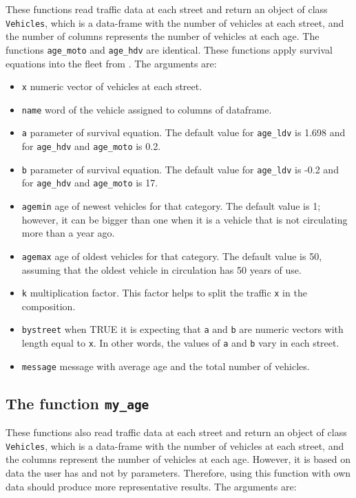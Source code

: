 \documentclass[12pt,graybox,envcountchap,sectrefs]{krantz}
\providecommand{\tightlist}{%
  \setlength{\itemsep}{0pt}\setlength{\parskip}{0pt}}
\theoremstyle{definition}
\theoremstyle{definition}
\theoremstyle{definition}
\theoremstyle{remark}
\begin{document}
These functions read traffic data at each street and return an object of
class \texttt{Vehicles}, which is a data-frame with the number of
vehicles at each street, and the number of columns represents the number
of vehicles at each age. The functions \texttt{age\_moto} and
\texttt{age\_hdv} are identical. These functions apply survival
equations into the fleet from \citet{MMA2011}. The arguments are:

\begin{itemize}
\tightlist
\item
  \texttt{x} numeric vector of vehicles at each street.
\item
  \texttt{name} word of the vehicle assigned to columns of dataframe.
\item
  \texttt{a} parameter of survival equation. The default value for
  \texttt{age\_ldv} is 1.698 and for \texttt{age\_hdv} and
  \texttt{age\_moto} is 0.2.
\item
  \texttt{b} parameter of survival equation. The default value for
  \texttt{age\_ldv} is -0.2 and for \texttt{age\_hdv} and
  \texttt{age\_moto} is 17.
\item
  \texttt{agemin} age of newest vehicles for that category. The default
  value is 1; however, it can be bigger than one when it is a vehicle
  that is not circulating more than a year ago.
\item
  \texttt{agemax} age of oldest vehicles for that category. The default
  value is 50, assuming that the oldest vehicle in circulation has 50
  years of use.
\item
  \texttt{k} multiplication factor. This factor helps to split the
  traffic \texttt{x} in the composition.
\item
  \texttt{bystreet} when TRUE it is expecting that \texttt{a} and
  \texttt{b} are numeric vectors with length equal to \texttt{x}. In
  other words, the values of \texttt{a} and \texttt{b} vary in each
  street.
\item
  \texttt{message} message with average age and the total number of
  vehicles.
\end{itemize}

\subsection{\texorpdfstring{The function
\texttt{my\_age}}{The function my\_age}}\label{the-function-my_age}

These functions also read traffic data at each street and return an
object of class \texttt{Vehicles}, which is a data-frame with the number
of vehicles at each street, and the columns represent the number of
vehicles at each age. However, it is based on data the user has and not
by parameters. Therefore, using this function with own data should
produce more representative results. The arguments are:
\end{document}
